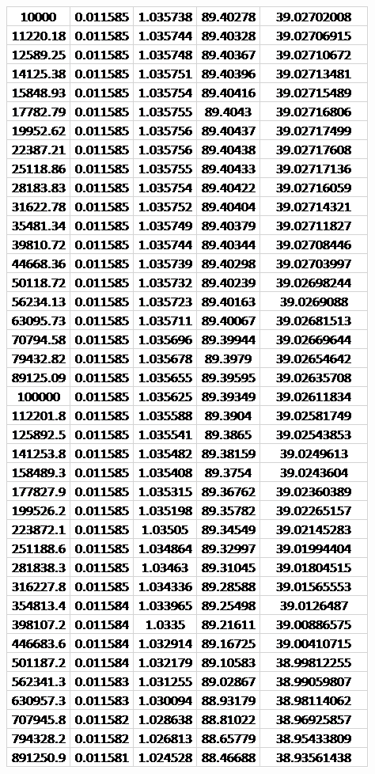 \documentclass{article}
\begin{document}
	\pagebreak
	\begin{table}[!ht]
		\centering
		\includegraphics[width=0.4\textheight]{data_cascode_gain_3.png}
	\end{table}
\end{document}
